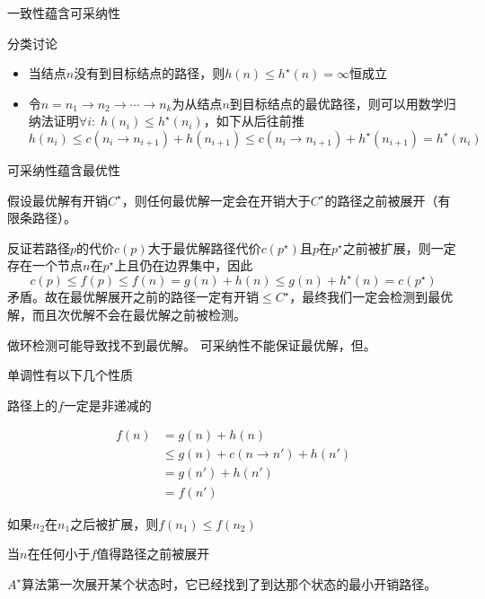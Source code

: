 \begin{theorem}
一致性蕴含可采纳性
\end{theorem}
\begin{analysis}
分类讨论
\begin{itemize}
	\item 当结点$n$没有到目标结点的路径，则$h(n)\leq h^\star(n)=\infty$恒成立
	\item 令$n=n_1\to n_2\to\cdots\to n_k$为从结点$n$到目标结点的最优路径，则可以用数学归纳法证明$\forall i:\;h(n_i)\leq h^\star(n_i)$，如下从后往前推
	\[h(n_{i})\leq c(n_i\to n_{i+1})+h(n_{i+1})\leq c(n_i\to n_{i+1}) + h^\star(n_{i+1})=h^\star(n_i)\]
\end{itemize}
\end{analysis}

\begin{theorem}
可采纳性蕴含最优性
\end{theorem}
\begin{analysis}
假设最优解有开销$C^\star$，则任何最优解一定会在开销大于$C^\star$的路径之前被展开（有限条路径）。

反证若路径$p$的代价$c(p)$大于最优解路径代价$c(p^\star)$且$p$在$p^\star$之前被扩展，则一定存在一个节点$n$在$p^\star$上且仍在边界集中，因此
\[c(p)\leq f(p)\leq f(n)=g(n)+h(n)\leq g(n)+h^\star(n)=c(p^\star)\]
矛盾。故在最优解展开之前的路径一定有开销$\leq C^\star$，最终我们一定会检测到最优解，而且次优解不会在最优解之前被检测。
\end{analysis}

做环检测可能导致找不到最优解。
可采纳性不能保证最优解，但。

单调性有以下几个性质
\begin{proposition}
路径上的$f$一定是非递减的
\end{proposition}
\begin{analysis}
\[\begin{aligned}
f(n)&=g(n)+h(n)\\
&\leq g(n)+c(n\to n')+h(n')\\
&= g(n')+h(n')\\
&= f(n')
\end{aligned}\]
\end{analysis}
\begin{proposition}
如果$n_2$在$n_1$之后被扩展，则$f(n_1)\leq f(n_2)$
\end{proposition}
\begin{proposition}
当$n$在任何小于$f$值得路径之前被展开
\end{proposition}
\begin{proposition}
$A^\star$算法第一次展开某个状态时，它已经找到了到达那个状态的最小开销路径。
\end{proposition}

